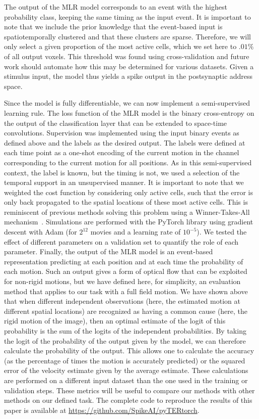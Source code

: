 \documentclass[default]{sn-jnl}%
\theoremstyle{thmstyleone}%
\theoremstyle{thmstyletwo}%
\theoremstyle{thmstylethree}%
\begin{document}
%
The output of the MLR model corresponds to an event with the highest probability class, keeping the same timing as the input event. It is important to note that we include the prior knowledge that the event-based input is spatiotemporally clustered and that these clusters are sparse. Therefore, we will only select a given proportion of the most active cells, which we set here to $.01\%$ of all output voxels. This threshold was found using cross-validation and future work should automate how this may be determined for various datasets. Given a stimulus input, the model thus yields a spike output in the postsynaptic address space.

%
Since the model is fully differentiable, we can now implement a semi-supervised learning rule. The loss function of the MLR model is the binary cross-entropy on the output of the classification layer that can be extended to space-time convolutions. Supervision was implemented using the input binary events as defined above and the labels as the desired output. The labels were defined at each time point as a one-shot encoding of the current motion in the channel corresponding to the current motion for all positions. As in this semi-supervised context, the label is known, but the timing is not, we used a selection of the temporal support in an unsupervised manner. It is important to note that we weighted the cost function by considering only active cells, such that the error is only back propagated to the spatial locations of these most active cells. This is reminiscent of previous methods solving this problem using a Winner-Takes-All mechanism~\citep{masquelier_unsupervised_2007}. Simulations are performed with the PyTorch library using gradient descent with Adam (for $2^{12}$ movies and a learning rate of $10^{-5}$). We tested the effect of different parameters on a validation set to quantify the role of each parameter.
%
Finally, the output of the MLR model is an event-based representation predicting at each position and at each time the probability of each motion. Such an output gives a form of optical flow that can be exploited for non-rigid motions, but we have defined here, for simplicity, an evaluation method that applies to our task with a full field motion. We have shown above that when different independent observations (here, the estimated motion at different spatial locations) are recognized as having a common cause (here, the rigid motion of the image), then an optimal estimate of the logit of this probability is the sum of the logits of the independent probabilities. By taking the logit of the probability of the output given by the model, we can therefore calculate the probability of the output. This allows one to calculate the accuracy (as the percentage of times the motion is accurately predicted) or the squared error %
of the velocity estimate given by the average estimate. 
These calculations are performed on a different input dataset than the one used in the training or validation steps. These metrics will be useful to compare our methods with other methods on our defined task.  The complete code to reproduce the results of this paper is available at \url{https://github.com/SpikeAI/pyTERtorch}.  
%
\end{document}
